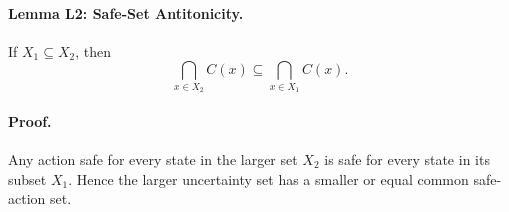 \paragraph{Lemma L2: Safe-Set Antitonicity.}
If \(X_1\subseteq X_2\), then
\[
\bigcap_{x\in X_2}C(x)\subseteq \bigcap_{x\in X_1}C(x).
\]

\paragraph{Proof.}
Any action safe for every state in the larger set \(X_2\) is safe for every
state in its subset \(X_1\). Hence the larger uncertainty set has a smaller or
equal common safe-action set.

